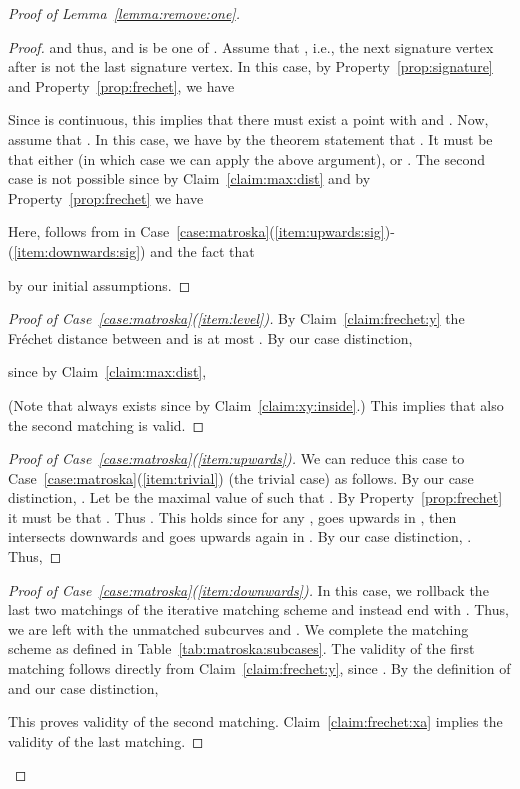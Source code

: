\documentclass[11pt, letter]{article}
\newcommand{\lemref}[1]{Lemma~\ref{lemma:#1}}
\newcommand{\tabref}[1]{Table~\ref{tab:#1}}
\newcommand{\caseref}[1]{Case~\ref{case:#1}}
\newcommand{\claimref}[1]{Claim~\ref{claim:#1}}
\newcommand{\propref}[1]{Property~\ref{prop:#1}}
\newcommand{\Frechet}{Fr\'echet\xspace}
\begin{document}
\begin{proof}[Proof of \lemref{remove:one}]
\begin{proof}
and thus,  and  is be one of 
.
Assume that , i.e., the next signature vertex after
 is not the last signature vertex. In this case, by
\propref{signature} and \propref{frechet}, we have

Since  is continuous, this implies that there must exist a point 
with  and .
Now, assume that . In this case, we have by the theorem statement
that .
It must be that either 
(in which case we can apply the above argument), or 
. The second
case is not possible since by \claimref{max:dist} and by \propref{frechet}
we have 

Here,  follows from  
in \caseref{matroska}(\ref{item:upwards:sig})-(\ref{item:downwards:sig})
and the fact that 

by our initial assumptions.
\end{proof}

\begin{proof}[Proof of \caseref{matroska}(\ref{item:level})]


By \claimref{frechet:y} the \Frechet distance between  and
 is at most .
By our case distinction,  
 
since by \claimref{max:dist},

(Note that  always exists since  by
\claimref{xy:inside}.) 
This implies that also the second matching is valid.
\end{proof}

\begin{proof}[Proof of \caseref{matroska}(\ref{item:upwards})]
We can reduce this case to \caseref{matroska}(\ref{item:trivial}) (the trivial case) as
follows.
By our case distinction,  . Let  be the
maximal value of  such that .
By \propref{frechet} 
it must be that . Thus . This holds since for any ,  goes upwards in , then intersects  downwards and goes upwards again in . By our case distinction, . Thus, 

\end{proof}

\begin{proof}[Proof of \caseref{matroska}(\ref{item:downwards})]
In this case, we rollback the last two matchings of the iterative matching
scheme and instead end with . Thus, we are left with the 
unmatched subcurves  and .  
We complete the matching scheme as defined in \tabref{matroska:subcases}.
The validity of the first matching follows directly from
\claimref{frechet:y}, since .
By the definition of  and our case distinction, 

This proves validity of the second matching.
\claimref{frechet:xa} implies the validity of the last matching.
\end{proof}


\end{proof}
\end{document}
